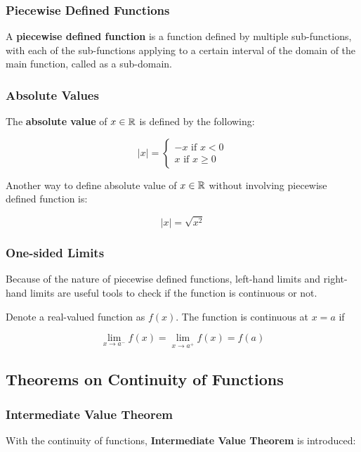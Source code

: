 \documentclass[a4paper,12pt]{article}
\begin{document}
\subsubsection{Piecewise Defined Functions}
\begin{dft}
  A \textbf{piecewise defined function} is a function defined by multiple sub-functions, with each of the sub-functions applying to a certain interval of the domain of the main function, called as a sub-domain.
\end{dft}

\subsubsection{Absolute Values}
\begin{dft}
  The \textbf{absolute value} of $x\in \mathbb{R}$ is defined by the following:

  $$\left| x\right| =\left\{ \begin{matrix}
    -x\text{ if }x<0\\
    x\text{ if }x\geq 0
  \end{matrix}\right.$$

  Another way to define absolute value of $x\in \mathbb{R}$ without involving piecewise defined function is:

  $$\left| x\right| =\sqrt{x^{2}}$$
\end{dft}

\subsubsection{One-sided Limits}
Because of the nature of piecewise defined functions, left-hand limits and right-hand limits are useful tools to check if the function is continuous or not.\n

\begin{thm}
  Denote a real-valued function as $f(x)$. The function is continuous at $x=a$ if

  $$\lim_{x\to a^{-}}f(x)=\lim_{x\to a^{+}}f(x)=f(a)$$
\end{thm}

\subsection{Theorems on Continuity of Functions}
\subsubsection{Intermediate Value Theorem}
With the continuity of functions, \textbf{Intermediate Value Theorem} is introduced:\n
\end{document}
